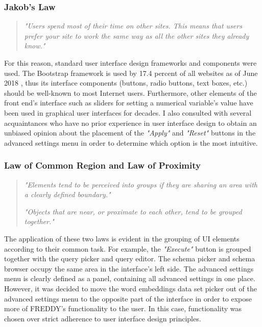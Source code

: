 \subsubsection{Jakob’s Law}
\begin{quote}
	\textit{"Users spend most of their time on other sites. This means that users prefer your site to work the same way as all the other sites they already know."}
\end{quote}
For this reason, standard user interface design frameworks and components were used. The Bootstrap framework is used by 17.4 percent of all websites as of June 2018 \cite{bootstrap-stats}, thus its interface components (buttons, radio buttons, text boxes, etc.) should be well-known to most Internet users. Furthermore, other elements of the front end's interface such as sliders for setting a numerical variable's value have been used in graphical user interfaces for decades. I also consulted with several acquaintances who have no prior experience in user interface design to obtain an unbiased opinion about the placement of the \textit{"Apply"} and \textit{"Reset"} buttons in the advanced settings menu in order to determine which option is the most intuitive.

\subsubsection{Law of Common Region and Law of Proximity}
\begin{quote}
	\textit{"Elements tend to be perceived into groups if they are sharing an area with a clearly defined boundary."}
	
	\textit{"Objects that are near, or proximate to each other, tend to be grouped together."} 
\end{quote}
The application of these two laws is evident in the grouping of UI elements according to their common task. For example, the \textit{"Execute"} button is grouped together with the query picker and query editor. The schema picker and schema browser occupy the same area in the interface's left side. The advanced settings menu is clearly defined as a panel, containing all advanced settings in one place. However, it was decided to move the word embeddings data set picker out of the advanced settings menu to the opposite part of the interface in order to expose more of FREDDY's functionality to the user. In this case, functionality was chosen over strict adherence to user interface design principles.

